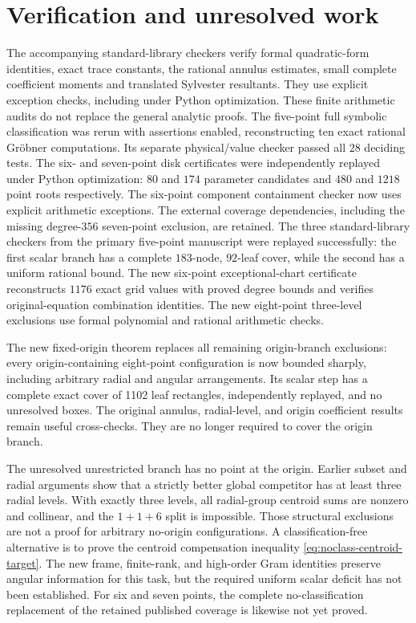 \documentclass[11pt]{article}
\theoremstyle{remark}
\numberwithin{equation}{section}
\begin{document}
\section{Verification and unresolved work}
The accompanying standard-library checkers verify formal quadratic-form
identities, exact trace constants, the rational annulus estimates, small
complete coefficient moments and translated Sylvester resultants.
They use explicit exception checks, including under Python optimization.
These finite arithmetic audits do not replace the general analytic proofs.
The five-point full symbolic classification was rerun with assertions
enabled, reconstructing ten exact rational Gr\"obner computations.
Its separate physical/value checker passed all $28$ deciding tests.
The six- and seven-point disk certificates were independently replayed
under Python optimization: $80$ and $174$ parameter candidates and $480$
and $1218$ point roots respectively. The six-point component containment
checker now uses explicit arithmetic exceptions. The external coverage
dependencies, including the missing degree-$356$ seven-point exclusion,
are retained.
The three standard-library checkers from the primary five-point manuscript
were replayed successfully: the first scalar branch has a complete
$183$-node, $92$-leaf cover, while the second has a uniform rational bound.
The new six-point exceptional-chart certificate reconstructs $1176$ exact
grid values with proved degree bounds and verifies original-equation
combination identities. The new eight-point three-level exclusions use
formal polynomial and rational arithmetic checks.

The new fixed-origin theorem replaces all remaining origin-branch
exclusions: every origin-containing eight-point configuration is now
bounded sharply, including arbitrary radial and angular arrangements.
Its scalar step has a complete exact cover of 1102 leaf rectangles,
independently replayed, and no unresolved boxes. The original annulus,
radial-level, and origin coefficient results remain useful cross-checks.
They are no longer required to cover the origin branch.

The unresolved unrestricted branch has no point at the origin.
Earlier subset and radial arguments show that a strictly better global
competitor has at least three radial levels. With exactly three levels,
all radial-group centroid sums are nonzero and collinear, and the
$1+1+6$ split is impossible. Those structural exclusions are not a
proof for arbitrary no-origin configurations. A classification-free
alternative is to prove the centroid compensation inequality
\eqref{eq:noclass-centroid-target}. The new frame, finite-rank, and
high-order Gram identities preserve angular information for this task,
but the required uniform scalar deficit has not been established.
For six and seven points, the complete no-classification replacement
of the retained published coverage is likewise not yet proved.
\end{document}
